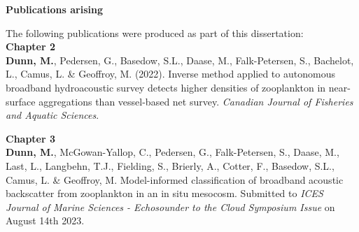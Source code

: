 \begin{center}
\textbf{\large Publications arising}
\end{center}

The following publications were produced as part of this dissertation:
\\

\textbf{Chapter 2}
\\
\textbf{Dunn, M.}, Pedersen, G., Basedow, S.L., Daase, M., Falk-Petersen, S., Bachelot, L., Camus, L. \& Geoffroy, M. (2022). Inverse method applied to autonomous broadband hydroacoustic survey detects higher densities of zooplankton in near-surface aggregations than vessel-based net survey. \textit{Canadian Journal of Fisheries and Aquatic Sciences}.

\textbf{Chapter 3}
\\
\textbf{Dunn, M.}, McGowan-Yallop, C., Pedersen, G., Falk-Petersen, S., Daase, M.,  Last, L., Langbehn, T.J., Fielding, S., Brierly, A., Cotter, F., Basedow, S.L., Camus, L. \& Geoffroy, M. Model-informed classification of broadband acoustic backscatter from zooplankton in an in situ mesocosm. Submitted to \textit{ICES Journal of Marine Sciences - Echosounder to the Cloud Symposium Issue} on August 14th 2023.

